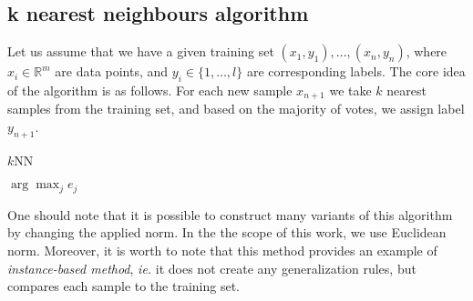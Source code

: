 \documentclass[aps,pra,showkeys,showpacs,notitlepage,superscriptaddress]{revtex4-1}
\newcommand{\1}{{\rm 1\hspace{-0.9mm}l}}
\newcommand{\ie}{\emph{ie.}\xspace}
\begin{document}
\subsection{k nearest neighbours algorithm}
\label{sec:kNN}
Let us assume that we have a given training set $(x_1,y_1),\ldots, (x_n,y_n)$, where 
$x_i\in \mathbb{R}^m$ are data points, and $y_i\in \{1,\ldots ,l\}$ are  
corresponding labels. The core idea of the algorithm is as follows. For each new sample 
$x_{n+1}$ we take $k$ nearest samples from the training set, and based on the 
majority of votes, we assign label $y_{n+1}$. 
\begin{algorithm}[H]
  \caption{$k$NN}
  \begin{algorithmic}[1]
    \EndFor
    \EndFor
    \State{}
    \Return $\arg\max_je_j$
  \end{algorithmic}
  \label{alg:kNN}
\end{algorithm}
One should note that it is possible to construct many variants of this algorithm by changing the applied  norm. In the the scope of this work, we use Euclidean norm. Moreover, it is worth to note that this method provides an example of \emph{instance-based method}, \ie it does not create any generalization rules, but compares each sample to the training set.
\end{document}
